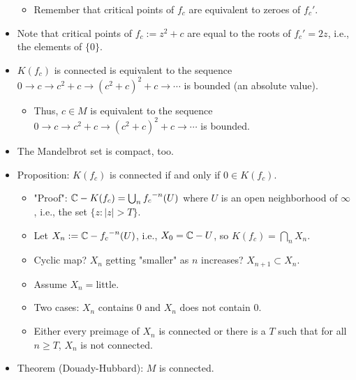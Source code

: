 \documentclass[../apprentice.tex]{subfiles}
\begin{document}
\begin{itemize}
\begin{itemize}
        \item Remember that critical points of $f_c$ are equivalent to zeroes of $f_c'$.
    \end{itemize}
    \item Note that critical points of $f_c:=z^2+c$ are equal to the roots of $f_c'=2z$, i.e., the elements of $\{0\}$.
    \item $K(f_c)$ is connected is equivalent to the sequence $0\to c\to c^2+c\to (c^2+c)^2+c\to\cdots$ is bounded (an absolute value).
    \begin{itemize}
        \item Thus, $c\in M$ is equivalent to the sequence $0\to c\to c^2+c\to (c^2+c)^2+c\to\cdots$ is bounded.
    \end{itemize}
    \item The Mandelbrot set is compact, too.
    \item Proposition: $K(f_c)$ is connected if and only if $0\in K(f_c)$.
    \begin{itemize}
        \item "Proof": $\mathbb{C}-K(f_c)=\bigcup_n{f_c}^{-n}(U)$ where $U$ is an open neighborhood of $\infty$, i.e., the set $\{z:|z|>T\}$.
        \item Let $X_n:=\mathbb{C}-{f_c}^{-n}(U)$, i.e., $X_0=\mathbb{C}-U$, so $K(f_c)=\bigcap_nX_n$.
        \item Cyclic map? $X_n$ getting "smaller" as $n$ increases? $X_{n+1}\subset X_n$.
        \item Assume $X_n=\text{little}$.
        \item Two cases: $X_n$ contains 0 and $X_n$ does not contain 0.
        \item Either every preimage of $X_n$ is connected or there is a $T$ such that for all $n\geq T$, $X_n$ is not connected.
    \end{itemize}
    \item Theorem (Douady-Hubbard): $M$ is connected.
\end{itemize}
\end{document}
